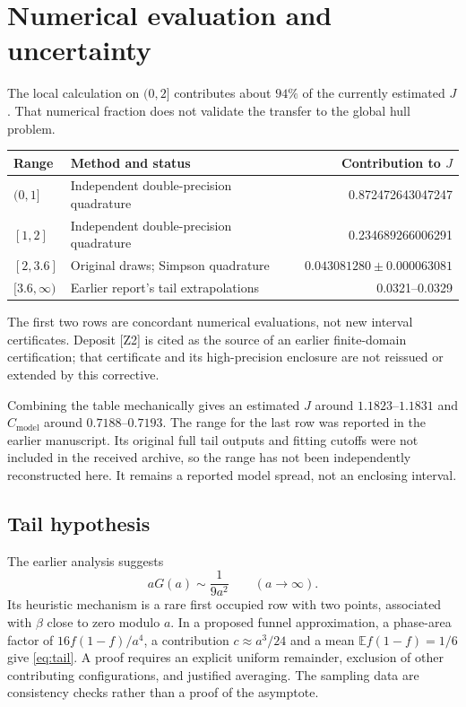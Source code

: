 \documentclass[11pt,a4paper]{article}
\newcommand{\E}{\mathbb E}
\newcommand{\Cmodel}{C_{\mathrm{model}}}
\begin{document}
\section{Numerical evaluation and uncertainty}\label{sec:numerics}
The local calculation on $(0,2]$ contributes about $94\%$ of the currently estimated $J$. That numerical fraction does not validate the transfer to the global hull problem.
\begin{center}
\begin{tabularx}{\linewidth}{lYr}
\toprule
Range & Method and status & Contribution to $J$\\
\midrule
$(0,1]$ & Independent double-precision quadrature & 0.872472643047247\\
$[1,2]$ & Independent double-precision quadrature & 0.234689266006291\\
$[2,3.6]$ & Original draws; Simpson quadrature & $0.043081280\pm0.000063081$\\
$[3.6,\infty)$ & Earlier report's tail extrapolations & 0.0321--0.0329\\
\bottomrule
\end{tabularx}
\end{center}
The first two rows are concordant numerical evaluations, not new interval certificates. Deposit [Z2] is cited as the source of an earlier finite-domain certification; that certificate and its high-precision enclosure are not reissued or extended by this corrective.

Combining the table mechanically gives an estimated $J$ around $1.1823$--$1.1831$ and $\Cmodel$ around $0.7188$--$0.7193$. The range for the last row was reported in the earlier manuscript. Its original full tail outputs and fitting cutoffs were not included in the received archive, so the range has not been independently reconstructed here. It remains a reported model spread, not an enclosing interval.

\subsection{Tail hypothesis}
The earlier analysis suggests
\begin{equation}\label{eq:tail}
 aG(a)\sim\frac1{9a^2}\qquad(a\to\infty).
\end{equation}
Its heuristic mechanism is a rare first occupied row with two points, associated with $\beta$ close to zero modulo $a$. In a proposed funnel approximation, a phase-area factor of $16f(1-f)/a^4$, a contribution $c\approx a^3/24$ and a mean $\E f(1-f)=1/6$ give \eqref{eq:tail}. A proof requires an explicit uniform remainder, exclusion of other contributing configurations, and justified averaging. The sampling data are consistency checks rather than a proof of the asymptote.
\end{document}
